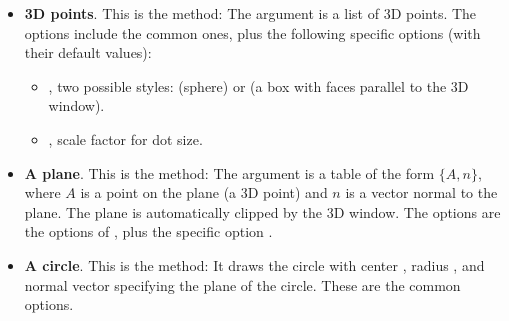\begin{itemize}
\begin{itemize}
        \item {} allows you to adjust the size of the arrows (width for the first number, height for the second). When  is a number, the second value is considered equal to the first.
        
        \item {}, style of hidden edges.
        \item {}: a number representing a percentage; the thickness of hidden lines is equal to that of visible lines multiplied by this number.  is a global variable that defaults to .
    \end{itemize}
    Example: drawing the axes
    \begin{Luacode}
    g:Pov_polyline({{-5*vecI,5*vecI},{-5*vecJ,5*vecJ},{-5*vecK,5*vecK}}, {arrows=1,width=8})
    \end{Luacode}
    
    \item \textbf{3D points}. This is the method: 
    The argument  is a list of 3D points. The options include the common ones, plus the following specific options (with their default values): 
        \begin{itemize}
            \item {}, two possible styles:  (sphere) or  (a box with faces parallel to the 3D window).
            \item {}, scale factor for dot size.
        \end{itemize}
       
    \item \textbf{A plane}. This is the method: 
    The argument  is a table of the form $\{A, n\}$, where $A$ is a point on the plane  (a 3D point) and $n$ is a vector normal to the plane. The plane is automatically clipped by the 3D window. The options are the options of , plus the specific option .
    
    \item \textbf{A circle}. This is the method: 
    It draws the circle with center , radius , and normal vector  specifying the plane of the circle. These are the common options.
    

\end{itemize}
